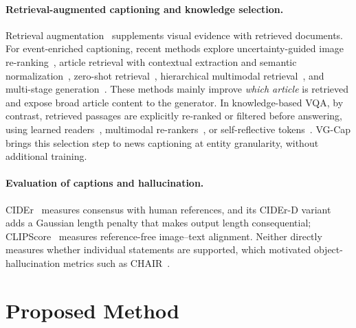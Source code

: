 \documentclass[runningheads]{llncs}
\DeclareRobustCommand{\revise}[1]{{\color{blue}#1}}
\DeclareRobustCommand{\revise}[1]{#1}
\begin{document}
\paragraph{\textbf{Retrieval-augmented captioning and knowledge selection.}}
Retrieval augmentation~\cite{lewis2020rag,ramos2023smallcap} supplements visual evidence with retrieved documents. For event-enriched captioning, recent methods explore uncertainty-guided image re-ranking~\cite{enric}, article retrieval with contextual extraction and semantic normalization~\cite{recap}, zero-shot retrieval~\cite{dinh2025zsecap}, hierarchical multimodal retrieval~\cite{nguyen2026hierarchical}, and multi-stage generation~\cite{hien2026cian}. These methods mainly improve \emph{which article} is retrieved and expose broad article content to the generator. \revise{In knowledge-based VQA, by contrast, retrieved passages are explicitly re-ranked or filtered before answering, using learned readers~\cite{gui2022kat}, multimodal re-rankers~\cite{yan2024echosight}, or self-reflective tokens~\cite{cocchi2025reflectiva}. VG-Cap brings this selection step to news captioning at entity granularity, without additional training.}

\paragraph{\textbf{Evaluation of captions and hallucination.}}
CIDEr~\cite{vedantam2015cider} measures consensus with human references, and its CIDEr-D variant adds a Gaussian length penalty that makes output length consequential; CLIPScore~\cite{hessel2021clipscore} measures reference-free image--text alignment. \revise{Neither directly measures whether individual statements are supported, which motivated object-hallucination metrics such as CHAIR~\cite{rohrbach2018object}.}

\section{Proposed Method}
\label{sec:method}
\end{document}
